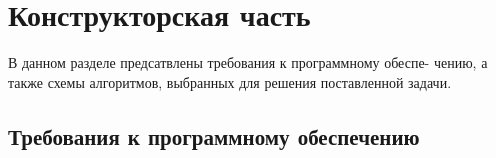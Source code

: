 \chapter{Конструкторская часть}

В данном разделе предсатвлены требования к программному обеспе-
чению, а также схемы алгоритмов, выбранных для решения поставленной
задачи.

\section{Требования к программному обеспечению}